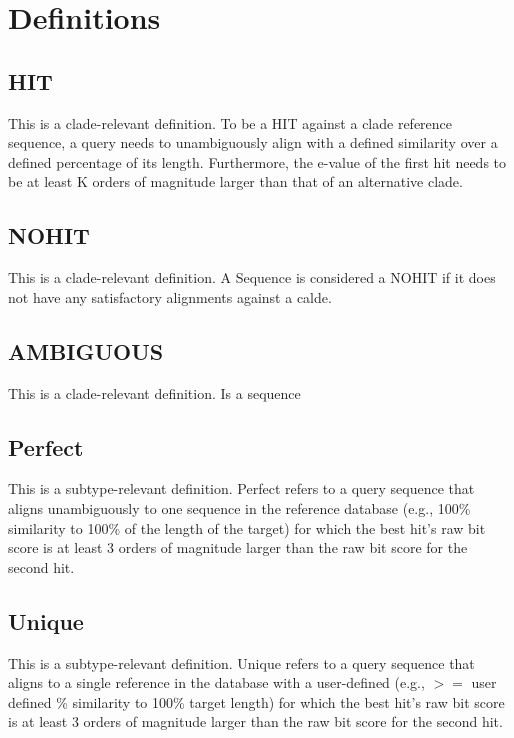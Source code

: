 \documentclass[letterpaper,10pt,english]{sphinxmanual}
\begin{document}
\section{Definitions}
\label{defs:definitions}

\subsection{HIT}
\label{defs:hits}\label{defs:hit}
This is a clade-relevant definition. To be a HIT against a clade reference sequence, a query needs to unambiguously align with a defined similarity over a defined percentage of its length.
Furthermore, the e-value of the first hit needs to be at least K orders of magnitude larger than that of an alternative clade.


\subsection{NOHIT}
\label{defs:nohits}\label{defs:nohit}
This is a clade-relevant definition. A Sequence is considered a NOHIT if it does not have any satisfactory alignments against a calde.


\subsection{AMBIGUOUS}
\label{defs:ambiguous}\label{defs:id1}
This is a clade-relevant definition. Is a sequence


\subsection{Perfect}
\label{defs:perfect}\label{defs:id2}
This is a subtype-relevant definition. Perfect refers to a query
sequence that aligns unambiguously to one sequence in the reference
database (e.g., 100\% similarity to 100\% of the length of the target)
for which the best hit's raw bit score is at least 3 orders of
magnitude larger than the raw bit score for the second hit.


\subsection{Unique}
\label{defs:unique}\label{defs:id3}
This is a subtype-relevant definition. Unique refers to a query sequence that aligns to a single reference in
the database with a user-defined (e.g., \(>=\) user defined \% similarity
to 100\% target length) for which the best hit's raw bit score is at
least 3 orders of magnitude larger than the raw bit score for the
second hit.
\end{document}
